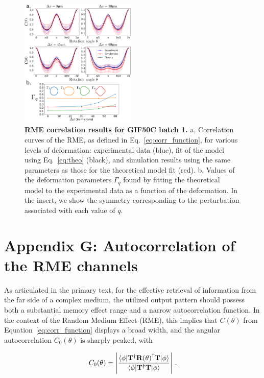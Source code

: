 \documentclass[aps,prl,twocolumn, amsmath,amssymb,superscriptaddress]{revtex4-2}
\DeclarePairedDelimiter\bra{\langle}{\rvert}
\DeclarePairedDelimiter\ket{\lvert}{\rangle}
\begin{document}
\begin{figure}[ht]
\includegraphics[width=0.49\textwidth]{images_si/Fig_GRIN3.pdf}
\caption{
\textbf{RME correlation results for GIF50C batch 1.}
    a, Correlation curves of the RME, as defined in Eq.~\ref{eq:corr_function},
    for various levels of deformation:
    experimental data (blue),
    fit of the model using Eq.~\ref{eq:theo} (black),
    and simulation results using the same parameters as those for the theoretical model fit (red).
    b, Values of the deformation parameters $\Gamma_q$ found by fitting
    the theoretical model to the experimental data
    as a function of the deformation.
    In the insert, we show the symmetry corresponding to the perturbation associated with each value of $q$.
}
\label{fig:tl1}
\end{figure}

\section*{Appendix G: Autocorrelation of the RME channels}


As articulated in the primary text, for the effective retrieval of information from the far side of a complex medium, 
the utilized output pattern should possess both a substantial memory effect range and a narrow autocorrelation function. 
In the context of the Random Medium Effect (RME), this implies that 
$C(\theta)$ from Equation~\ref{eq:corr_function} displays a broad width, 
and the angular autocorrelation $C_0(\theta)$ is sharply peaked, with

\begin{equation}
    C_0(\theta) =  
        \left|
        \frac{
            \bra{\phi}\mathbf{T}^\dagger\mathbf{R(\theta)}^\dagger\mathbf{T}\ket{\phi}
        }{
                \bra{\phi}\mathbf{T}^\dagger\mathbf{T}\ket{\phi}        
        }
        \right|
    \, .
\end{equation}
\end{document}
